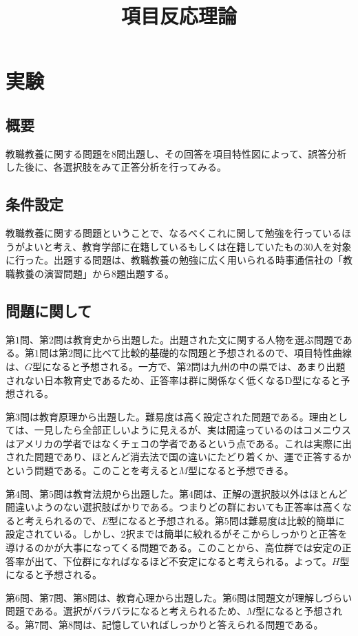 \documentclass[12pt]{jarticle}
\title{項目反応理論}
\begin{document}
\maketitle
\section{実験}
\subsection{概要}
教職教養に関する問題を$8$問出題し、その回答を項目特性図によって、誤答分析した後に、各選択肢をみて正答分析を行ってみる。
\subsection{条件設定}
教職教養に関する問題ということで、なるべくこれに関して勉強を行っているほうがよいと考え、教育学部に在籍しているもしくは在籍していたもの$30$人を対象に行った。出題する問題は、教職教養の勉強に広く用いられる時事通信社の「教職教養の演習問題」から$8$題出題する。
\subsection{問題に関して}
第$1$問、第$2$問は教育史から出題した。出題された文に関する人物を選ぶ問題である。第$1$問は第$2$問に比べて比較的基礎的な問題と予想されるので、項目特性曲線は、$G$型になると予想される。一方で、第$2$問は九州の中の県では、あまり出題されない日本教育史であるため、正答率は群に関係なく低くなるD型になると予想される。

第$3$問は教育原理から出題した。難易度は高く設定された問題である。理由としては、一見したら全部正しいように見えるが、実は間違っているのはコメニウスはアメリカの学者ではなくチェコの学者であるという点である。これは実際に出された問題であり、ほとんど消去法で国の違いにたどり着くか、運で正答するかという問題である。このことを考えると$M$型になると予想できる。

第$4$問、第$5$問は教育法規から出題した。第$4$問は、正解の選択肢以外はほとんど間違いようのない選択肢ばかりである。つまりどの群においても正答率は高くなると考えられるので、$E$型になると予想される。第$5$問は難易度は比較的簡単に設定されている。しかし、$2$択までは簡単に絞れるがそこからしっかりと正答を導けるのかが大事になってくる問題である。このことから、高位群では安定の正答率が出て、下位群になればなるほど不安定になると考えられる。よって。$H$型になると予想される。

第$6$問、第$7$問、第$8$問は、教育心理から出題した。第$6$問は問題文が理解しづらい問題である。選択がバラバラになると考えられるため、$M$型になると予想される。第$7$問、第$8$問は、記憶していればしっかりと答えられる問題である。
\end{document}
